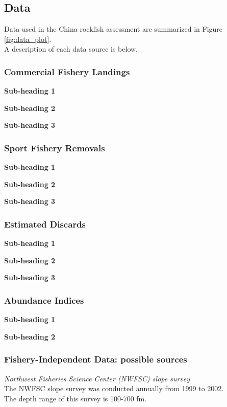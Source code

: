 \documentclass[12pt,]{article}
\begin{document}
\subsection{Data}\label{data}

Data used in the China rockfish assessment are summarized in Figure
\ref{fig:data_plot}.\\
A description of each data source is below.

\subsubsection{Commercial Fishery
Landings}\label{commercial-fishery-landings}

\textbf{Sub-heading 1}

\textbf{Sub-heading 2}

\textbf{Sub-heading 3}

\subsubsection{Sport Fishery Removals}\label{sport-fishery-removals}

\textbf{Sub-heading 1}

\textbf{Sub-heading 2}

\textbf{Sub-heading 3}

\subsubsection{Estimated Discards}\label{estimated-discards}

\textbf{Sub-heading 1}

\textbf{Sub-heading 2}

\textbf{Sub-heading 3}

\subsubsection{Abundance Indices}\label{abundance-indices}

\textbf{Sub-heading 1}

\textbf{Sub-heading 2}

\subsubsection{Fishery-Independent Data: possible
sources}\label{fishery-independent-data-possible-sources}

\emph{Northwest Fisheries Science Center (NWFSC) slope survey}\\
The NWFSC slope survey was conducted annually from 1999 to 2002.\\
The depth range of this survey is 100-700 fm.
\end{document}
